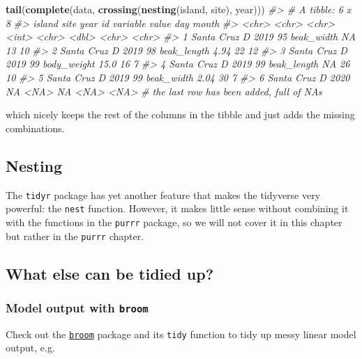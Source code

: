 \documentclass[]{book}
\newenvironment{Shaded}{}{}
\newcommand{\CommentTok}[1]{\textcolor[rgb]{0.38,0.63,0.69}{\textit{#1}}}
\newcommand{\KeywordTok}[1]{\textcolor[rgb]{0.00,0.44,0.13}{\textbf{#1}}}
\newcommand{\NormalTok}[1]{#1}
\begin{document}
\begin{Shaded}
\begin{Highlighting}[]
\KeywordTok{tail}\NormalTok{(}\KeywordTok{complete}\NormalTok{(data, }\KeywordTok{crossing}\NormalTok{(}\KeywordTok{nesting}\NormalTok{(island, site), year))) }
\CommentTok{#> # A tibble: 6 x 8}
\CommentTok{#>   island     site  year     id variable    value day   month}
\CommentTok{#>   <chr>      <chr> <chr> <int> <chr>       <dbl> <chr> <chr>}
\CommentTok{#> 1 Santa Cruz D     2019     95 beak_width  NA    13    10   }
\CommentTok{#> 2 Santa Cruz D     2019     98 beak_length  4.94 22    12   }
\CommentTok{#> 3 Santa Cruz D     2019     99 body_weight 15.0  16    7    }
\CommentTok{#> 4 Santa Cruz D     2019     99 beak_length NA    26    10   }
\CommentTok{#> 5 Santa Cruz D     2019     99 beak_width   2.04 30    7    }
\CommentTok{#> 6 Santa Cruz D     2020     NA <NA>        NA    <NA>  <NA>}
\CommentTok{# the last row has been added, full of NAs}
\end{Highlighting}
\end{Shaded}

which nicely keeps the rest of the columns in the tibble and just adds the missing combinations.

\hypertarget{nesting}{%
\subsection{Nesting}\label{nesting}}

The \texttt{tidyr} package has yet another feature that makes the tidyverse very powerful: the \texttt{nest} function. However, it makes little sense without combining it with the functions in the \texttt{purrr} package, so we will not cover it in this chapter but rather in the \texttt{purrr} chapter.

\hypertarget{what-else-can-be-tidied-up}{%
\subsection{What else can be tidied up?}\label{what-else-can-be-tidied-up}}

\hypertarget{model-output-with-broom}{%
\subsubsection{\texorpdfstring{Model output with \texttt{broom}}{Model output with broom}}\label{model-output-with-broom}}

Check out the \href{https://cran.r-project.org/web/packages/broom/vignettes/broom.html}{\texttt{broom}} package and its \texttt{tidy} function to tidy up messy linear model output, e.g.
\end{document}
